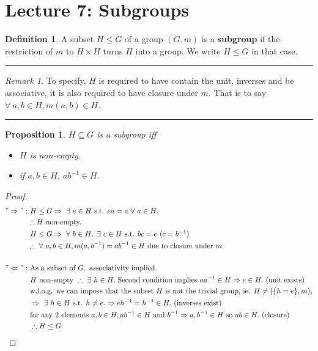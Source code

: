 \documentclass{article}
\newtheorem{theorem}{Proposition}[section]
\theoremstyle{definition}
\newtheorem{definition}{Definition}[section]
\theoremstyle{remark}
\newtheorem*{remark}{Remark}
\begin{document}
\section{Lecture 7: Subgroups}
\begin{definition}
A subset $H\leq G$ of a group $(G,m)$ is a \textbf{subgroup} if the restriction of $m$ to $H\times H$ turns $H$ into a group. We write $H\leq  G$ in that case.\\
\end{definition}
\hrule
\vspace{2mm}
\begin{remark}
To specify, $H$ is required to have contain the unit, inverses and be associative, it is also required to have closure under $m$. That is to say $\forall ~a,b\in H,m(a,b)\in H$.\\
\end{remark}
\hrule
\begin{theorem}
$H\subseteq G$ is a subgroup iff
\begin{itemize}
\item $H$ is non-empty.
\item if $a,b\in H$, $ab^{-1}\in H$.
\end{itemize}
\end{theorem}
\begin{proof}
\begin{align*}
"\Rightarrow":&~H\leq G\Rightarrow ~\exists~ e\in H\text{ s.t. } ea=a~\forall~a\in H.\\
&\therefore H\text{ non-empty.}\\
&~H\leq G\Rightarrow ~\forall ~ b\in H,~\exists~c\in H\text{ s.t. }bc=e~(c=b^{-1})\\
&\therefore ~\forall~ a,b\in H,m(a,b^{-1})=ab^{-1}\in H\text{ due to closure under } m\\
~\\
"\Leftarrow":& \text{ As a subset of } G,\text{ associativity implied.}\\
&~ H \text{ non-empty } \therefore ~\exists~h\in H.\text{ Second condition implies } aa^{-1}\in H\Rightarrow e\in H.\text{ (unit exists)}\\
&\text{ w.l.o.g. we can impose that the subset }H\text{ is not the trivial group, ie. }H\neq(\lbrace h=e\rbrace,m),\\
&~\Rightarrow ~\exists~h\in H\text{ s.t. } h\neq e.\Rightarrow eh^{-1}=h^{-1}\in H.\text{ (inverses exist)}\\
&~\text{for any 2 elements } a,b\in H, ab^{-1}\in H\text{ and } b^{-1}\Rightarrow a,b^{-1}\in H\text{ so } ab\in H. \text{ (closure)}\\
&~\therefore H\leq G.
\end{align*}
\end{proof}
\end{document}
